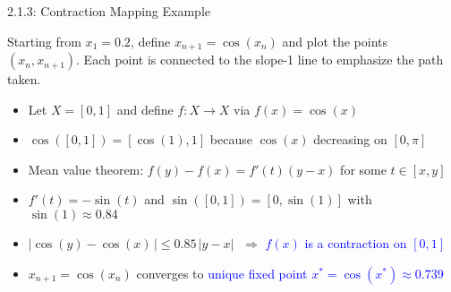 \documentclass[10pt,english]{beamer}
\begin{document}
\begin{frame}{2.1.3: Contraction Mapping Example}

\begin{minipage}{0.45\textwidth}
Starting from $x_1 = 0.2$, define $x_{n+1}= \cos(x_n)$ and plot the points $(x_n,x_{n+1})$.  Each point is connected to the slope-1 line to emphasize the path taken.
\end{minipage}
\begin{minipage}{0.5\textwidth}
\scalebox{0.75}{}
\end{minipage}
\vspace{1mm}

\begin{itemize}
\setlength\itemsep{1.5mm}
\item<1-> Let $X=[0,1]$ and define $f\colon X\to X$ via $f(x)=\cos(x)$

\item<2-> $\cos([0,1]) = [\cos(1),1]$ because $\cos(x)$ decreasing on $[0,\pi]$

\item<3-> Mean value theorem: $f(y)-f(x) = f'(t) (y-x)$ for some $t\in [x,y]$

\item<4-> $f'(t) = -\sin(t)$ and $\sin([0,1]) = [0,\sin(1)]$ with $\sin(1) \approx 0.84$

\item<5-> $| \cos(y) - \cos(x) \,| \leq 0.85 \, |y-x|$ $\;\Rightarrow$ \textcolor{blue}{$f(x)$ is a contraction on $[0,1]$}

\item<6-> $x_{n+1} \!= \cos(x_n)$  converges to \textcolor{blue}{unique fixed point $x^* \!= \cos(x^*) \!\approx\! 0.739$}
\end{itemize}

\end{frame}  
\end{document}
